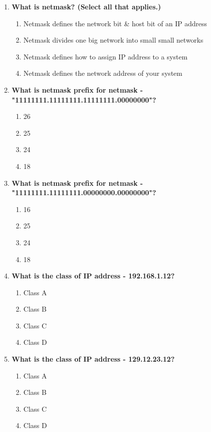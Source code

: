 \begin{flushleft}
\begin{enumerate}
		\item \textbf{What is netmask? (Select all that applies.)}
		\begin{enumerate}[label=(\alph*)]
			\item Netmask defines the network bit \& host bit of an IP address %
			\item Netmask divides one big network into small small networks %
			\item Netmask defines how to assign IP address to a system
			\item Netmask defines the network address of your system
		\end{enumerate}
		\bigskip
		\bigskip		
		

		\item \textbf{What is netmask prefix for netmask - "11111111.11111111.11111111.00000000"?}
		\begin{enumerate}[label=(\alph*)]
			\item 26
			\item 25
			\item 24  %
			\item 18
		\end{enumerate}
		\bigskip
		\bigskip

		\item \textbf{What is netmask prefix for netmask - "11111111.11111111.00000000.00000000"?}
		\begin{enumerate}[label=(\alph*)]
			\item 16  %
			\item 25
			\item 24  
			\item 18
		\end{enumerate}
		\bigskip
		\bigskip

		\item \textbf{What is the class of IP address - 192.168.1.12?}
		\begin{enumerate}[label=(\alph*)]
			\item Class A
			\item Class B
			\item Class C  %
			\item Class D
		\end{enumerate}
		\bigskip
		\bigskip

		\item \textbf{What is the class of IP address - 129.12.23.12?}
		\begin{enumerate}[label=(\alph*)]
			\item Class A
			\item Class B  %
			\item Class C  
			\item Class D
		\end{enumerate}
		\bigskip
		\bigskip


\end{enumerate}
\end{flushleft}
